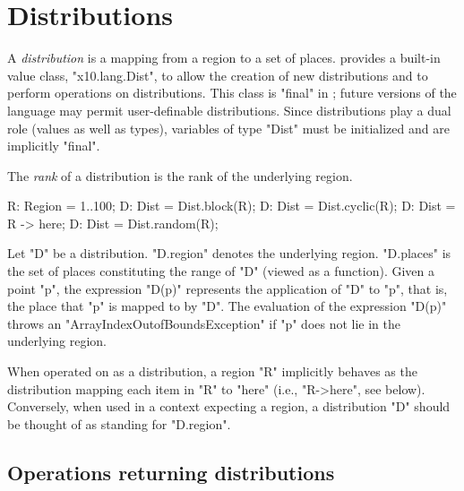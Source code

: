 \section{Distributions}\label{XtenDistributions}

A {\em distribution} is a mapping from a region to a set of places.
{}\Xten{} provides a built-in value class, \xcd"x10.lang.Dist", to allow the creation of new distributions and
to perform operations on distributions. This class is \xcd"final" in
{}\XtenCurrVer; future versions of the language may permit
user-definable distributions. Since distributions play a dual role
(values as well as types), variables of type \xcd"Dist" must
be initialized and are implicitly \xcd"final".

The {\em rank} of a distribution is the rank of the underlying region.



\begin{xten}
R: Region = 1..100;
D: Dist = Dist.block(R);
D: Dist = Dist.cyclic(R);
D: Dist = R -> here;
D: Dist = Dist.random(R);
\end{xten}

Let \xcd"D" be a distribution. \xcd"D.region" denotes the underlying
region. \xcd"D.places" is the set of places constituting the range of
\xcd"D" (viewed as a function). Given a point \xcd"p", the expression
\xcd"D(p)" represents the application of \xcd"D" to \xcd"p", that is,
the place that \xcd"p" is mapped to by \xcd"D". The evaluation of the
expression \xcd"D(p)" throws an \xcd"ArrayIndexOutofBoundsException"
if \xcd"p" does not lie in the underlying region.

When operated on as a distribution, a region \xcd"R" implicitly
behaves as the distribution mapping each item in \xcd"R" to \xcd"here"
(i.e., \xcd"R->here", see below). Conversely, when used in a context
expecting a region, a distribution \xcd"D" should be thought of as
standing for \xcd"D.region".

{}

\subsection{Operations returning distributions}

